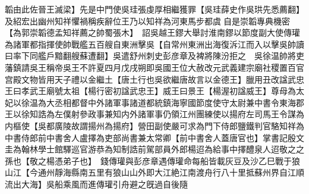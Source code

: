 韜由此佐晉王滅梁】先是中門使吳珪張虔厚相繼獲罪【吳珪薛史作吳珙先悉薦翻】及紹宏出幽州知祥懼禍稱疾辭位王乃以知祥為河東馬步都虞自是崇韜專典機密【為郭崇韜德孟知祥薦之帥蜀張木】　詔吳越王鏐大舉討淮南鏐以節度副大使傳瓘為諸軍都指揮使帥戰艦五百艘自東洲擊吳【自常州東洲出海復泝江而入以擊吳帥讀曰率下同艦戶黯翻艘蘇遭翻】吳遣舒州刺史彭彦章及裨將陳汾拒之　吳徐温帥將吏藩鎮請吳王稱帝吳王不許夏四月戊戌朔即吳國王位大赦改元武義建宗廟社稷置百官宫殿文物皆用天子禮以金繼土【唐土行也吳欲繼唐故言以金德王】臘用丑改諡武忠王曰孝武王廟號太祖【楊行密初諡武忠王】威王曰景王【楊渥初諡威王】尊母為太妃以徐温為大丞相都督中外諸軍事諸道都統鎮海寧國節度使守太尉兼中書令東海郡王以徐知誥為左僕射參政事兼知内外諸軍事仍領江州團練使以揚府左司馬王令謀為内樞使【吳都廣陵故謂揚州為揚府】營田副使嚴可求為門下侍郎鹽鐵判官駱知祥為中書侍郎前中書舍人盧擇為吏部尚書兼太常卿【前中書舍人蓋唐官也】掌書記殷文圭為翰林學士館驛巡官游恭為知制誥前駕部員外郎楊迢為給事中擇醴泉人迢敬之之孫也【敬之楊憑弟子也】　錢傳瓘與彭彦章遇傳瓘命每船皆載灰豆及沙乙巳戰于狼山江【今通州靜海縣南五里有狼山山外即大江絶江南渡舟行八十里抵蘇州界自江順流出大海】吳船乘風而進傳瓘引舟避之旣過自後隨